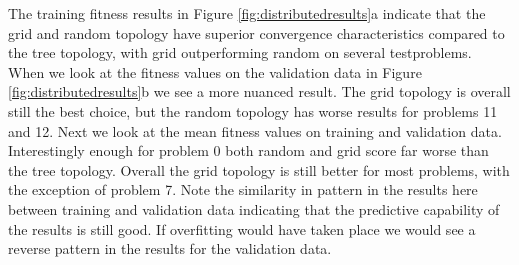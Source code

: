 The training fitness results in Figure \ref{fig:distributedresults}a indicate that the grid and random topology have superior convergence characteristics compared to the tree topology, with grid outperforming random on several testproblems. When we look at the fitness values on the validation data in Figure \ref{fig:distributedresults}b we see a more nuanced result. The grid topology is overall still the best choice, but the random topology has worse results for problems 11 and 12.
Next we look at the mean fitness values on training and validation data. Interestingly enough for problem 0 both random and grid score far worse than the tree topology. Overall the grid topology is still better for most problems, with the exception of problem 7. Note the similarity in pattern in the results here between training and validation data indicating that the predictive capability of the results is still good. If overfitting would have taken place we would see a reverse pattern in the results for the validation data.




